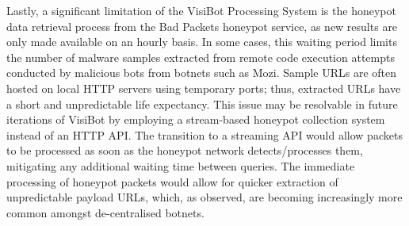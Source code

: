Lastly, a significant limitation of the VisiBot Processing System is the honeypot data retrieval process from the Bad Packets \citep{BadPackets} honeypot service, as new results are only made available on an hourly basis. In some cases, this waiting period limits the number of malware samples extracted from remote code execution attempts conducted by malicious bots from botnets such as Mozi. Sample URLs are often hosted on local HTTP servers using temporary ports; thus, extracted URLs have a short and unpredictable life expectancy. This issue may be resolvable in future iterations of VisiBot by employing a stream-based honeypot collection system instead of an HTTP API. The transition to a streaming API would allow packets to be processed as soon as the honeypot network detects/processes them, mitigating any additional waiting time between queries. The immediate processing of honeypot packets would allow for quicker extraction of unpredictable payload URLs, which, as observed, are becoming increasingly more common amongst de-centralised botnets.